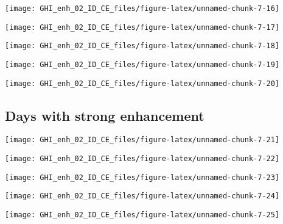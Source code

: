 \documentclass[
  10pt,
  a4paper,oneside]{article}
\begin{document}
\begin{center}\texttt{[image: GHI\_enh\_02\_ID\_CE\_files/figure-latex/unnamed-chunk-7-16]} \end{center}

\begin{center}\texttt{[image: GHI\_enh\_02\_ID\_CE\_files/figure-latex/unnamed-chunk-7-17]} \end{center}

\begin{center}\texttt{[image: GHI\_enh\_02\_ID\_CE\_files/figure-latex/unnamed-chunk-7-18]} \end{center}

\begin{center}\texttt{[image: GHI\_enh\_02\_ID\_CE\_files/figure-latex/unnamed-chunk-7-19]} \end{center}

\begin{center}\texttt{[image: GHI\_enh\_02\_ID\_CE\_files/figure-latex/unnamed-chunk-7-20]} \end{center}

\FloatBarrier

\hypertarget{days-with-strong-enhancement}{%
\subsection{Days with strong enhancement}\label{days-with-strong-enhancement}}

\begin{center}\texttt{[image: GHI\_enh\_02\_ID\_CE\_files/figure-latex/unnamed-chunk-7-21]} \end{center}

\begin{center}\texttt{[image: GHI\_enh\_02\_ID\_CE\_files/figure-latex/unnamed-chunk-7-22]} \end{center}

\begin{center}\texttt{[image: GHI\_enh\_02\_ID\_CE\_files/figure-latex/unnamed-chunk-7-23]} \end{center}

\begin{center}\texttt{[image: GHI\_enh\_02\_ID\_CE\_files/figure-latex/unnamed-chunk-7-24]} \end{center}

\begin{center}\texttt{[image: GHI\_enh\_02\_ID\_CE\_files/figure-latex/unnamed-chunk-7-25]} \end{center}
\end{document}
